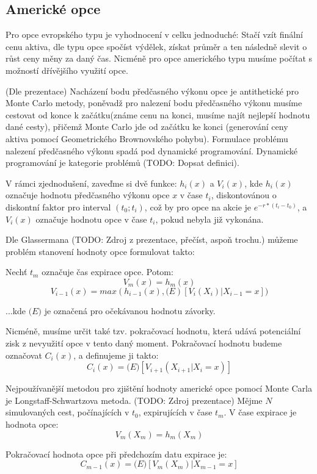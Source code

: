 \documentclass[male,czech,api_bc]{kitheses}
\begin{document}
  \subsection{Americké opce}

  Pro opce evropského typu je vyhodnocení v celku jednoduché: Stačí vzít finální cenu aktiva, dle typu opce spočíst výdělek, získat průměr a ten následně slevit o růst ceny měny za daný čas. Nicméně pro opce amerického typu musíme počítat s možností dřívějšího využití opce.

  (Dle prezentace) Nacházení bodu předčasného výkonu opce je antithetické pro Monte Carlo metody, poněvadž pro nalezení bodu předčasného výkonu musíme cestovat od konce k začátku(známe cenu na konci, musíme najít nejlepší hodnotu dané cesty), přičemž Monte Carlo jde od začátku ke konci (generování ceny aktiva pomocí Geometrického Brownovského pohybu).
  Formulace problému nalezení předčasného výkonu spadá pod dynamické programování. Dynamické programování je kategorie problémů (TODO: Dopsat definici).

  V rámci zjednodušení, zaveďme si dvě funkce: $h_i(x)$ a $V_i(x)$, kde $h_i(x)$ označuje hodnotu předčasného výkonu opce $x$ v čase $t_i$, diskontovánou o diskontní faktor pro interval $(t_0; t_i)$, což by pro opce na akcie je $e^{-r * (t_i - t_0)}$, a $V_i(x)$ označuje hodnotu opce v čase $t_i$, pokud nebyla již vykonána.

  Dle Glassermana (TODO: Zdroj z prezentace, přečíst, aspoň trochu.) můžeme problém stanovení hodnoty opce formulovat takto:

  Nechť $t_m$ označuje čas expirace opce. Potom:
  $$V_m(x) = h_m(x)$$
  $$V_{i-1}(x) = max(h_{i-1}(x), \mathbb(E)[V_i(X_i) | X_{i-1} = x])$$

  ...kde $\mathbb(E)$ je označená pro očekávanou hodnotu závorky.

  Nicméně, musíme určit také tzv. pokračovací hodnotu, která udává potenciální zisk z nevyužití opce v tento daný moment. Pokračovací hodnotu budeme označovat $C_i(x)$, a definujeme ji takto:
  $$C_i(x) = \mathbb(E)[V_{i+1}(X_{i+1} | X_i = x)]$$

  Nejpoužívanější metodou pro zjištění hodnoty americké opce pomocí Monte Carla je Longstaff-Schwartzova metoda. (TODO: Zdroj prezentace) Mějme $N$ simulovaných cest, počínajících v $t_0$, expirujících v čase $t_m$. V čase expirace je hodnota opce:
  $$ V_m(X_m) = h_m(X_m) $$

  Pokračovací hodnota opce při předchozím datu expirace je:
  $$ C_{m-1}(x) = \mathbb(E)[V_m(X_m) | X_{m-1} = x] $$
\end{document}
